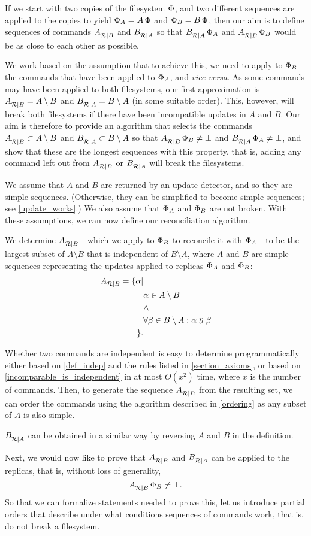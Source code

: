 
If we start with two copies of the filesystem $\Phi$,
and two different sequences are applied to the copies to yield $\Phi_A=A\,\Phi$
and $\Phi_B=B\,\Phi$, then our aim is to define sequences of commands ${A}^{}_{\mathcal{R}|{B}}$ and ${B}^{}_{\mathcal{R}|{A}}$
so that ${B}^{}_{\mathcal{R}|{A}}\,\Phi_A$ and ${A}^{}_{\mathcal{R}|{B}}\,\Phi_B$ would be as close to each other as possible.

We work based on the assumption that to achieve this, we need
to apply to $\Phi_B$ the commands that have been applied to $\Phi_A$, and \emph{vice versa}.
As some commands may have been applied to both filesystems, our first approximation
is ${A}^{}_{\mathcal{R}|{B}} = A\setminus B$ and ${B}^{}_{\mathcal{R}|{A}} = B\setminus A$
(in some suitable order).
This, however, will break both filesystems if there have been incompatible updates
in $A$ and $B$. 
Our aim is therefore to provide an algorithm that selects the commands 
${A}^{}_{\mathcal{R}|{B}} \subset A\setminus B$
and ${B}^{}_{\mathcal{R}|{A}} \subset B\setminus A$ 
so that ${A}^{}_{\mathcal{R}|{B}}\,\Phi_B\neq\bot$ and ${B}^{}_{\mathcal{R}|{A}}\,\Phi_A\neq\bot$,
and show that these are the longest sequences with this property, that is,
adding any command left out from ${A}^{}_{\mathcal{R}|{B}}$ or ${B}^{}_{\mathcal{R}|{A}}$ will break the filesystems.

We assume that $A$ and $B$ are returned by an update detector,
and so they are simple sequences.
(Otherwise, they can be simplified to become simple sequences; see \cref{update_works}.)
We also assume that $\Phi_A$ and $\Phi_B$ are not broken.
With these assumptions,
we can now define our reconciliation algorithm.

\begin{mydef}[Reconciliation]\label{def:reconciliation}
We determine ${A}^{}_{\mathcal{R}|{B}}$---which we apply to $\Phi_B$ 
to reconcile it with $\Phi_A$---to be
the largest subset of $A\setminus B$
that is independent of $B\setminus A$,
where $A$ and $B$ are simple sequences representing
the updates applied to replicas $\Phi_A$ and $\Phi_B$:
\begin{align*}
{A}^{}_{\mathcal{R}|{B}} = \{\alpha|{}& \\
& \alpha\in A\setminus B \\
& \wedge \\
& \forall \beta\in B\setminus A: \alpha\mathrel{\wr\wr}\beta\\
\}. &
\end{align*}
\end{mydef}

Whether two commands are independent is easy to determine programmatically
either based on \cref{def_indep} and the rules listed in \cref{section_axioms},
or based on \cref{incomparable_is_independent} 
in at most $O(x^2)$ time, where $x$ is the number of commands.
Then, to generate the sequence ${A}^{}_{\mathcal{R}|{B}}$ from the resulting set, 
we can order the commands using the algorithm described in
\cref{ordering} as any subset of $A$ is also simple.

${B}^{}_{\mathcal{R}|{A}}$ can be obtained in a similar way by reversing $A$ and $B$
in the definition.

\bigskip

\noindent
Next, we would now like to prove that ${A}^{}_{\mathcal{R}|{B}}$ and ${B}^{}_{\mathcal{R}|{A}}$ can be applied to the replicas,
that is, without loss of generality,
\[ {A}^{}_{\mathcal{R}|{B}}\,\Phi_B\neq\bot. \]
So that we can formalize statements needed to prove this,
let us introduce partial orders that describe under what conditions
sequences of commands work, that is, do not break a filesystem.

